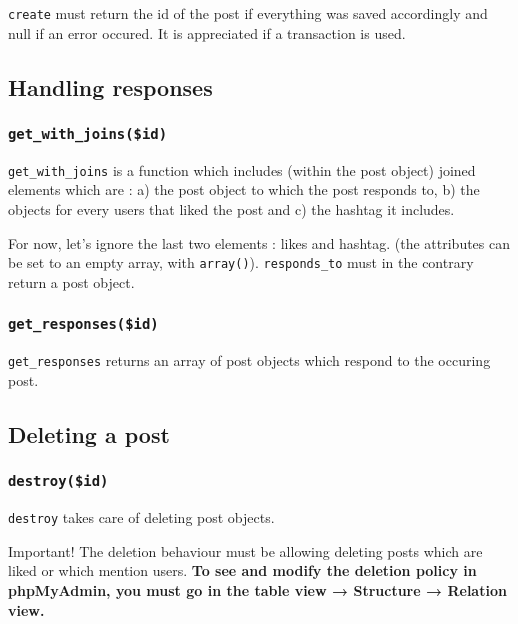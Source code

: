 \documentclass[twoside,a4paper,12pt]{article}
\begin{document}
\texttt{create} must return the id of the post if everything was saved accordingly and null if an error occured. It is appreciated if a transaction is used.

\subsection{Handling responses}

\subsubsection{\texttt{get\_with\_joins(\$id)}}

\texttt{get\_with\_joins} is a function which includes (within the post object) joined elements which are : a) the post object to which the post responds to, b) the objects for every users that liked the post and c) the hashtag it includes.

For now, let's ignore the last two elements : likes and hashtag. (the attributes can be set to an empty array, with \texttt{array()}). \texttt{responds\_to} must in the contrary return a post object.

\subsubsection{\texttt{get\_responses(\$id)}}

\texttt{get\_responses} returns an array of post objects which respond to the occuring post.

\subsection{Deleting a post}

\subsubsection{\texttt{destroy(\$id)}}

\texttt{destroy} takes care of deleting post objects.

\begin{bclogo}[logo=\bcattention, noborder=true, barre=none]{Important!}
	The deletion behaviour must be allowing deleting posts which are liked or which mention users. \textbf{To see and modify the deletion policy in phpMyAdmin, you must go in the table view → Structure → Relation view.}
		
\end{bclogo}
\end{document}
